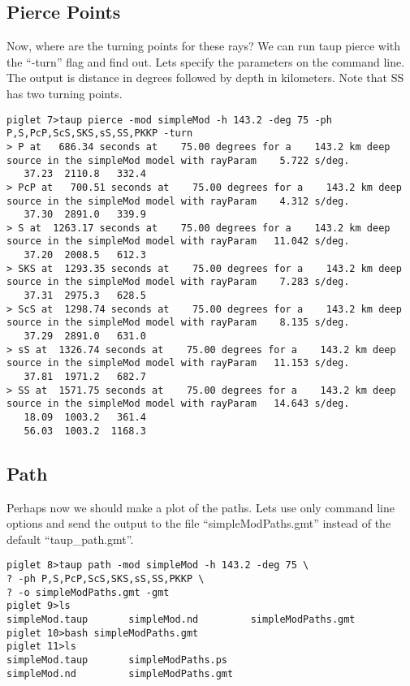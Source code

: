 \subsection{Pierce Points}

Now, where are the turning points for these rays? We can run taup pierce with
the ``-turn'' flag and
find out. Lets specify the parameters on the command line.
The output is distance in degrees followed by depth in kilometers.
Note that SS has two turning points.

\begin{verbatim}
piglet 7>taup pierce -mod simpleMod -h 143.2 -deg 75 -ph P,S,PcP,ScS,SKS,sS,SS,PKKP -turn
> P at   686.34 seconds at    75.00 degrees for a    143.2 km deep source in the simpleMod model with rayParam    5.722 s/deg.
   37.23  2110.8   332.4
> PcP at   700.51 seconds at    75.00 degrees for a    143.2 km deep source in the simpleMod model with rayParam    4.312 s/deg.
   37.30  2891.0   339.9
> S at  1263.17 seconds at    75.00 degrees for a    143.2 km deep source in the simpleMod model with rayParam   11.042 s/deg.
   37.20  2008.5   612.3
> SKS at  1293.35 seconds at    75.00 degrees for a    143.2 km deep source in the simpleMod model with rayParam    7.283 s/deg.
   37.31  2975.3   628.5
> ScS at  1298.74 seconds at    75.00 degrees for a    143.2 km deep source in the simpleMod model with rayParam    8.135 s/deg.
   37.29  2891.0   631.0
> sS at  1326.74 seconds at    75.00 degrees for a    143.2 km deep source in the simpleMod model with rayParam   11.153 s/deg.
   37.81  1971.2   682.7
> SS at  1571.75 seconds at    75.00 degrees for a    143.2 km deep source in the simpleMod model with rayParam   14.643 s/deg.
   18.09  1003.2   361.4
   56.03  1003.2  1168.3
\end{verbatim}

\subsection{Path}

Perhaps now we should make a plot of the
paths. Lets use only command line options and send the output to the file
``simpleModPaths.gmt'' instead of the default ``taup\_path.gmt''.

\begin{verbatim}
piglet 8>taup path -mod simpleMod -h 143.2 -deg 75 \
? -ph P,S,PcP,ScS,SKS,sS,SS,PKKP \
? -o simpleModPaths.gmt -gmt
piglet 9>ls
simpleMod.taup       simpleMod.nd         simpleModPaths.gmt
piglet 10>bash simpleModPaths.gmt
piglet 11>ls
simpleMod.taup       simpleModPaths.ps
simpleMod.nd         simpleModPaths.gmt
\end{verbatim}

